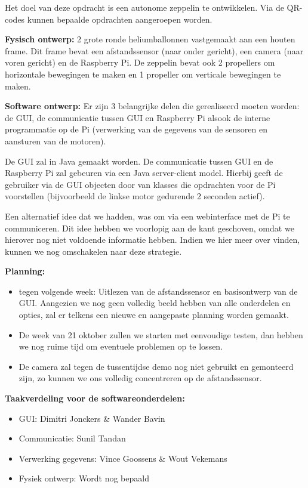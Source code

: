 \documentclass{peno-opdracht1}
\begin{document}
\maketitle

Het doel van deze opdracht is een autonome zeppelin te ontwikkelen. Via de QR-codes kunnen bepaalde opdrachten aangeroepen worden.

\textbf{Fysisch ontwerp:} 2 grote ronde heliumballonnen vastgemaakt aan een houten frame. Dit frame bevat een afstandssensor (naar onder gericht), een camera (naar voren gericht) en de Raspberry Pi. De zeppelin bevat ook 2 propellers om horizontale bewegingen te maken en 1 propeller om verticale bewegingen te maken.

\textbf{Software ontwerp:} Er zijn 3 belangrijke delen die gerealiseerd moeten worden: de GUI, de communicatie tussen GUI en Raspberry Pi alsook de interne programmatie op de Pi (verwerking van de gegevens van de sensoren en aansturen van de motoren).

De GUI zal in Java gemaakt worden. De communicatie tussen GUI en de Raspberry Pi zal gebeuren via een Java server-client model. Hierbij geeft de gebruiker via de GUI objecten door van klasses die opdrachten voor de Pi voorstellen (bijvoorbeeld de linkse motor gedurende 2 seconden actief).

Een alternatief idee dat we hadden, was om via een webinterface met de Pi te communiceren. Dit idee hebben we voorlopig aan de kant geschoven, omdat we hierover nog niet voldoende informatie hebben. Indien we hier meer over vinden, kunnen we nog omschakelen naar deze strategie.

\textbf{Planning:}
\begin{itemize}
\item tegen volgende week: Uitlezen van de afstandssensor en basisontwerp van de GUI. Aangezien we nog geen volledig beeld hebben van alle onderdelen en opties, zal er telkens een nieuwe en aangepaste planning worden gemaakt.
\item De week van 21 oktober zullen we starten met eenvoudige testen, dan hebben we nog ruime tijd om eventuele problemen op te lossen.
\item De camera zal tegen de tussentijdse demo nog niet gebruikt en gemonteerd zijn, zo kunnen we ons volledig concentreren op de afstandssensor.
\end{itemize}


\textbf{Taakverdeling voor de softwareonderdelen:}
\begin{itemize}
\item GUI: Dimitri Jonckers \& Wander Bavin
\item Communicatie: Sunil Tandan
\item Verwerking gegevens: Vince Goossens \& Wout Vekemans
\item Fysiek ontwerp: Wordt nog bepaald\\
\end{itemize}
\end{document}
